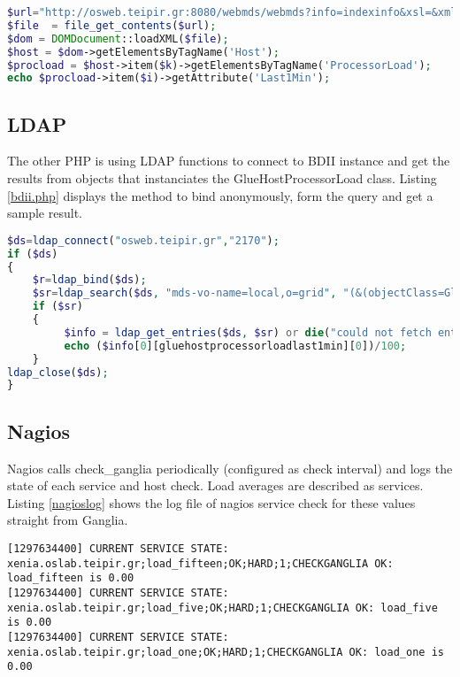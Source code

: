 \begin{lstlisting}[language=PHP,caption=PHP DOM call to WebMDS,label=wsrf.php]
$url="http://osweb.teipir.gr:8080/webmds/webmds?info=indexinfo&xsl=&xmlSource.indexinfo.param.xpathQuery=%2F%2F*[local-name%28%29%3D%27Host%27]";
$file  = file_get_contents($url);
$dom = DOMDocument::loadXML($file);
$host = $dom->getElementsByTagName('Host');
$procload = $host->item($k)->getElementsByTagName('ProcessorLoad');
echo $procload->item($i)->getAttribute('Last1Min');
\end{lstlisting}

\subsection{LDAP}

The other PHP is using LDAP functions to connect to BDII instance and get the results from objects that instanciates the GlueHostProcessorLoad class. Listing \ref{bdii.php} displays the method to bind anonymously, form the query and get a sample result.

\begin{lstlisting}[language=PHP,caption=PHP LDAP call to BDII,label=bdii.php]
$ds=ldap_connect("osweb.teipir.gr","2170");
if ($ds)
{
    $r=ldap_bind($ds);
    $sr=ldap_search($ds, "mds-vo-name=local,o=grid", "(&(objectClass=GlueHostProcessorLoad))");
    if ($sr)
    {
         $info = ldap_get_entries($ds, $sr) or die("could not fetch entries");
         echo ($info[0][gluehostprocessorloadlast1min][0])/100;
    }
ldap_close($ds);
}
\end{lstlisting}

\subsection{Nagios}

Nagios calls check\_ganglia periodically (configured as check interval) and logs the state of each service and host check. Load averages are described as services. Listing \ref{nagioslog} shows the log file of nagios service check for these values straight from Ganglia.
\begin{lstlisting}[caption=Nagios log with load check,label=nagioslog]
[1297634400] CURRENT SERVICE STATE: xenia.oslab.teipir.gr;load_fifteen;OK;HARD;1;CHECKGANGLIA OK: load_fifteen is 0.00
[1297634400] CURRENT SERVICE STATE: xenia.oslab.teipir.gr;load_five;OK;HARD;1;CHECKGANGLIA OK: load_five is 0.00
[1297634400] CURRENT SERVICE STATE: xenia.oslab.teipir.gr;load_one;OK;HARD;1;CHECKGANGLIA OK: load_one is 0.00
\end{lstlisting}

